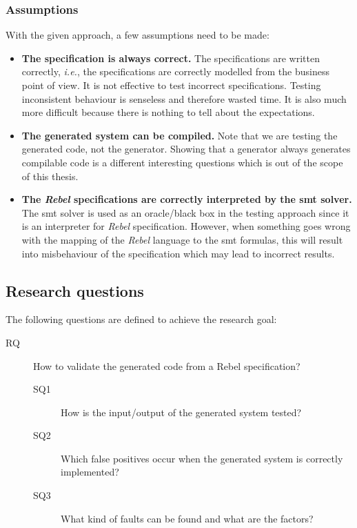 \subsubsection{Assumptions}

With the given approach, a few assumptions need to be made:
\begin{itemize}
\item \textbf{The specification is always correct.}
The specifications are written correctly, \textit{i.e.}, the specifications are
correctly modelled from the business point of view.
It is not effective to test incorrect specifications. Testing
inconsistent behaviour is senseless and therefore wasted time. It is also much
more difficult because there is nothing to tell about the expectations.
\item \textbf{The generated system can be compiled.} Note that we are testing
the generated code, not the generator. Showing that a generator always generates
compilable code is a different interesting questions which is out of the scope
of this thesis.
\item \textbf{The \textit{Rebel} specifications are correctly interpreted by the \gls{smt}
solver.} The \gls{smt} solver is used as an oracle/black box in the testing approach
since it is an interpreter for \textit{Rebel} specification. However, when
something goes wrong with the mapping of the \textit{Rebel} language to the \gls{smt}
formulas, this will result into misbehaviour of the specification which may lead
to incorrect results.
\end{itemize}

\subsection{Research questions}\label{sec:research-questions}
The following questions are defined to achieve the research goal:

\begin{description}
  \item [RQ] How to validate the generated code from a Rebel specification?

  \begin{description}
    \item [SQ1] How is the input/output of the generated system tested?
    \item [SQ2] Which false positives occur when the generated
    system is correctly implemented?
    \item [SQ3] What kind of faults can be found and what are the factors?
  \end{description}

\end{description}

